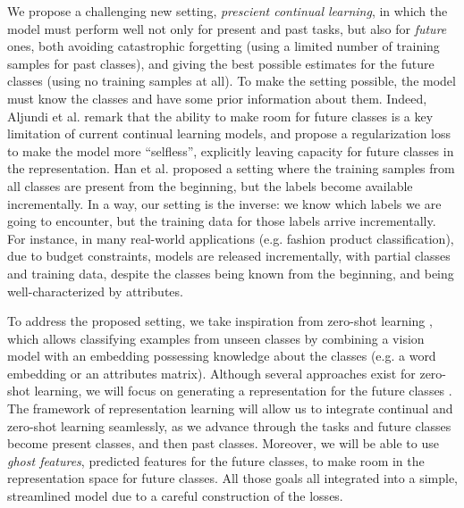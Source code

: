 We propose a challenging new setting, \textit{prescient continual learning}, in which the model must
perform well not only for present and past tasks, but also for \textit{future} ones, both avoiding
catastrophic forgetting (using a limited number of training samples for past classes), and giving
the best possible estimates for the future classes (using no training samples at all). To make the
setting possible, the model must know the classes and have some prior information about them.
Indeed, Aljundi et al. \cite{aljundi2019selfless} remark that the ability to make room for future
classes is a key limitation of current continual learning models, and propose a regularization loss
to make the model more “selfless”, explicitly leaving capacity for future classes in the
representation. Han et al. \cite{hanrebuffi2020autodiscovering} proposed a setting where the
training samples from all classes are present from the beginning, but the labels become available
incrementally. In a way, our setting is the inverse: we know which labels we are going to encounter,
but the training data for those labels arrive incrementally. For instance, in many real-world
applications (e.g. fashion product classification), due to budget constraints, models are released
incrementally, with partial classes and training data, despite the classes being known from the
beginning, and being well-characterized by attributes.

To address the proposed setting, we take inspiration from zero-shot learning
\cite{lampert2009zeroshot, xian2019awa2}, which allows classifying examples from unseen classes by
combining a vision model with an embedding possessing knowledge about the classes (e.g. a word
embedding \cite{mikolov2013word2vec,pennington2014glove} or an attributes matrix). Although several
approaches exist for zero-shot learning, we will focus on generating a representation for the future
classes \cite{bucher2017zeroshot_gmmn, kumar2018synthesized_zeroshot,
    xian2018feature_generating_zeroshot}. The framework of representation learning will allow us to
integrate continual and zero-shot learning seamlessly, as we advance through the tasks and future
classes become present classes, and then past classes. Moreover, we will be able to use
\textit{ghost features}, predicted features for the future classes, to make room in the
representation space for future classes. All those goals all integrated into a simple, streamlined
model due to a careful construction of the losses.

